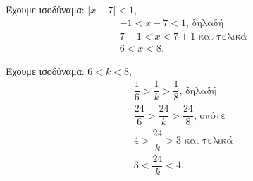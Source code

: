 
\begin{alist}
\item Έχουμε ισοδύναμα: $|x - 7| < 1$,
\begin{gather*}
-1 < x - 7 < 1\text{, δηλαδή} \\
7 - 1 < x < 7 + 1\text{ και τελικά} \\
6 < x < 8.
\end{gather*}

\item Έχουμε ισοδύναμα: $6 < k < 8$,
\begin{gather*}
\dfrac{1}{6} > \dfrac{1}{k} > \dfrac{1}{8}\text{, δηλαδή} \\
\dfrac{24}{6} > \dfrac{24}{k} > \dfrac{24}{8}\text{, οπότε} \\
4 > \dfrac{24}{k} > 3\text{ και τελικά} \\
3 < \dfrac{24}{k} < 4.
\end{gather*}
\end{alist}

